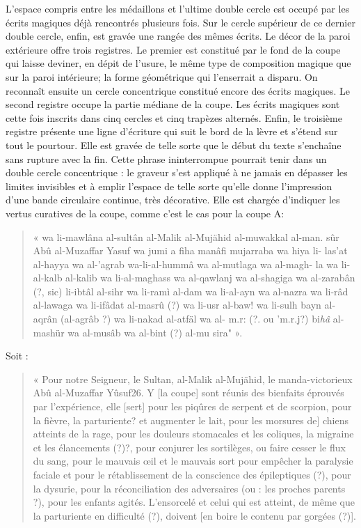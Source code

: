 L'espace compris entre les médaillons et l'ultime double cercle est
occupé par les écrits magiques déjà rencontrés plusieurs fois. Sur le cercle supérieur de ce dernier double cercle, enfin, est gravée une rangée
des mêmes écrits. Le décor de la paroi extérieure offre trois registres. Le premier est constitué par le fond de la coupe qui laisse deviner, en dépit de l'usure, le même type de composition magique que sur la paroi intérieure; la forme géométrique qui l'enserrait a disparu. On reconnaît ensuite un cercle concentrique constitué encore des écrits magiques. Le second registre occupe la partie médiane de la coupe. Les écrits magiques sont cette fois inscrits dans cinq cercles et cinq trapèzes alternés. Enfin, le troisième registre présente une ligne d'écriture qui suit le bord de la lèvre et s'étend sur tout le pourtour. Elle est gravée de telle sorte que le début du texte s'enchaîne sans rupture avec la fin. Cette phrase ininterrompue pourrait tenir dans un double cercle concentrique : le graveur s'est appliqué à ne jamais en dépasser les limites invisibles et à emplir l'espace de telle sorte qu'elle donne l'impression d'une bande circulaire continue, très décorative. Elle est chargée d'indiquer les vertus curatives de la coupe, comme c'est le cas pour la coupe A:
\begin{quote}
    « wa  li-mawlâna al-sultân al-Malik al-Mujähid al-muwakkal al-man.
sûr Abû al-Muzaffar Yasuf wa jumi a fiha manâfi mujarraba wa hiya li-
las'at al-hayya wa al-'agrab wa-li-al-hummâ wa al-mutlaga wa al-magh-
la wa li-al-kalb al-kalib wa li-al-maghass wa al-qawlanj wa al-shagiga
wa al-zarabân (?, sic) li-ibtâl al-sihr wa li-ramì al-dam wa li-al-ayn wa
al-nazra wa li-râd al-lawaga wa li-ifâdat al-masrû (?) wa li-usr al-baw!
wa li-sulh bayn al-aqrân (al-agrâb ?) wa li-nakad al-atfäl wa al- m.r: (?.
ou 'm.r.j?) bi\textit{hâ} al-mashür wa al-musâb wa al-bint (?) al-mu sira" ».
\end{quote}
Soit :
\begin{quote}
    {  « Pour notre Seigneur, le Sultan, al-Malik al-Mujähid, le manda-victorieux Abû al-Muzaffar Yûsuf26. Y [la coupe] sont réunis des bienfaits éprouvés par l'expérience, elle [sert] pour les piqûres de serpent et de scorpion, pour la fièvre, la parturiente? et augmenter le lait, pour les morsures de] chiens atteints de la rage, pour les douleurs stomacales et les coliques, la migraine et les élancements (?)?, pour conjurer les sortilèges, ou faire cesser le flux du sang, pour le mauvais œil et le mauvais sort  
pour empêcher la paralysie faciale et pour le rétablissement de la conscience des épileptiques (?), pour la dysurie, pour la réconciliation des adversaires (ou : les proches parents ?), pour les enfants agités. L'ensorcelé et celui qui est atteint, de même que la parturiente en difficulté (?), doivent [en boire le contenu par gorgées (?)].}
\end{quote}
